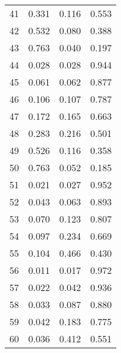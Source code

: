 \documentclass[10pt,a4paper]{exam}
\begin{document}
\begin{questions}
\begin{solution}
\begin{center}
\begin{tabular}{@{}cccc@{}}
41    & 0.331   & 0.116  & 0.553  \\
42    & 0.532   & 0.080  & 0.388  \\
43    & 0.763   & 0.040  & 0.197  \\
44    & 0.028   & 0.028  & 0.944  \\
45    & 0.061   & 0.062  & 0.877  \\
46    & 0.106   & 0.107  & 0.787  \\
47    & 0.172   & 0.165  & 0.663  \\
48    & 0.283   & 0.216  & 0.501  \\
49    & 0.526   & 0.116  & 0.358  \\
50    & 0.763   & 0.052  & 0.185  \\
51    & 0.021   & 0.027  & 0.952  \\
52    & 0.043   & 0.063  & 0.893  \\
53    & 0.070   & 0.123  & 0.807  \\
54    & 0.097   & 0.234  & 0.669  \\
55    & 0.104   & 0.466  & 0.430  \\
56    & 0.011   & 0.017  & 0.972  \\
57    & 0.022   & 0.042  & 0.936  \\
58    & 0.033   & 0.087  & 0.880  \\
59    & 0.042   & 0.183  & 0.775  \\
60    & 0.036   & 0.412  & 0.551  \\ \bottomrule
\end{tabular}
\end{center}

\end{solution}

\end{questions}
\pagebreak
\end{document}
